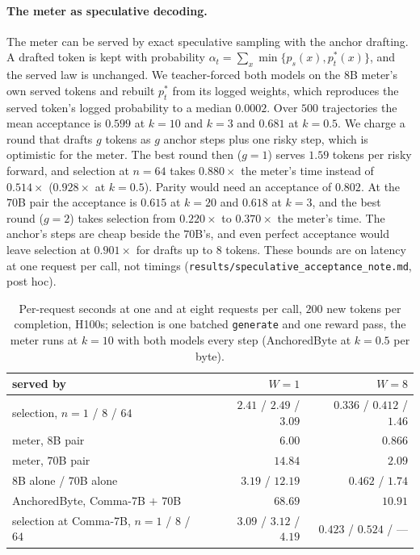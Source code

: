 \paragraph{The meter as speculative decoding.}\label{app:speculative}
The meter can be served by exact speculative sampling with the anchor drafting. A drafted token is kept
with probability $\alpha_t = \sum_x \min\{p_s(x), p^*_t(x)\}$, and the served law is unchanged. We
teacher-forced both models on the $8$B meter's own served tokens and rebuilt $p^*_t$ from its logged weights,
which reproduces the served token's logged probability to a median $0.0002$. Over $500$ trajectories the
mean acceptance is $0.599$ at $k=10$ and $k=3$ and $0.681$ at $k=0.5$. We charge a round that drafts $g$
tokens as $g$ anchor steps plus one risky step, which is optimistic for the meter. The best round then
($g=1$) serves $1.59$ tokens per risky forward, and selection at $n=64$ takes $0.880\times$ the meter's time
instead of $0.514\times$ ($0.928\times$ at $k=0.5$). Parity would need an acceptance of $0.802$. At the $70$B
pair the acceptance is $0.615$ at $k=20$ and $0.618$ at $k=3$, and the best round ($g=2$) takes selection from
$0.220\times$ to $0.370\times$ the meter's time. The anchor's steps are cheap beside the $70$B's, and even
perfect acceptance would leave selection at $0.901\times$ for drafts up to $8$ tokens. These bounds are on
latency at one request per call, not timings
(\texttt{results/\allowbreak speculative\_\allowbreak acceptance\_\allowbreak note.md}, post hoc).

\begin{table}[ht]
\centering\footnotesize
\caption{Per-request seconds at one and at eight requests per call, $200$ new tokens per completion,
H100s; selection is one batched \texttt{generate} and one reward pass, the meter runs at $k=10$ with both
models every step (AnchoredByte at $k=0.5$ per byte).}\label{tab:batched}
\begin{tabular}{@{}lrr@{}}
\toprule
served by & $W=1$ & $W=8$ \\
\midrule
selection, $n=1$ / $8$ / $64$ & $2.41$ / $2.49$ / $3.09$ & $0.336$ / $0.412$ / $1.46$ \\
meter, $8$B pair & $6.00$ & $0.866$ \\
meter, $70$B pair & $14.84$ & $2.09$ \\
$8$B alone / $70$B alone & $3.19$ / $12.19$ & $0.462$ / $1.74$ \\
AnchoredByte, Comma-7B $+$ $70$B & $68.69$ & $10.91$ \\
selection at Comma-7B, $n=1$ / $8$ / $64$ & $3.09$ / $3.12$ / $4.19$ & $0.423$ / $0.524$ / --- \\
\bottomrule
\end{tabular}
\end{table}
